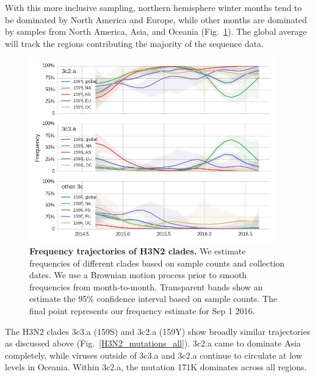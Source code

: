 \documentclass[11pt,oneside,letterpaper]{article}
\begin{document}
\pagebreak

With this more inclusive sampling, northern hemisphere winter months tend to be dominated by North America and Europe, while other months are dominated by samples from North America, Asia, and Oceania (Fig.\ \ref{H3N2_clades_all}). The global average will track the regions contributing the majority of the sequence data.

\begin{figure}[H]
	\centering
	\includegraphics[width=0.95\textwidth]{../figures/sep-2016/H3N2_clades_all.png}
	\caption{\textbf{Frequency trajectories of H3N2 clades.}
	We estimate frequencies of different clades based on sample counts and collection dates.
	We use a Brownian motion process prior to smooth frequencies from month-to-month.
	Transparent bands show an estimate the 95\% confidence interval based on sample counts.
	The final point represents our frequency estimate for Sep 1 2016.
	}
	\label{H3N2_clades_all}
\end{figure}

\pagebreak

The H3N2 clades 3c3.a (159S) and 3c2.a (159Y) show broadly similar trajectories as discussed above (Fig.\ \ref{H3N2_mutations_all}). 3c2.a came to dominate Asia completely, while viruses outside of 3c3.a and 3c2.a continue to circulate at low levels in Oceania. Within 3c2.a, the mutation 171K dominates across all regions.
\end{document}

